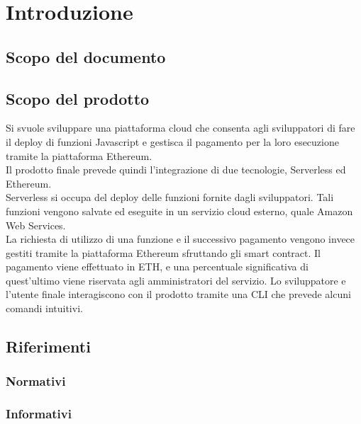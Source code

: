 \section{Introduzione}
\subsection{Scopo del documento}

\subsection{Scopo del prodotto}
	Si svuole sviluppare una piattaforma cloud che consenta agli sviluppatori di fare il deploy di funzioni Javascript e gestisca il pagamento per la loro esecuzione tramite la piattaforma Ethereum.\\
	Il prodotto finale prevede quindi l'integrazione di due tecnologie, Serverless ed Ethereum.\\
	Serverless si occupa del deploy delle funzioni fornite dagli sviluppatori. Tali funzioni vengono salvate ed eseguite in un servizio cloud esterno, quale Amazon Web Services.  \\La richiesta di utilizzo di una funzione e il successivo pagamento vengono invece gestiti tramite la piattaforma Ethereum sfruttando gli smart contract. Il pagamento viene effettuato in ETH, e una percentuale significativa di quest'ultimo viene riservata agli amministratori del servizio. 
	Lo sviluppatore e l'utente finale interagiscono con il prodotto tramite una CLI che prevede alcuni comandi intuitivi.

\subsection{Riferimenti}
\subsubsection{Normativi}
\subsubsection{Informativi}
